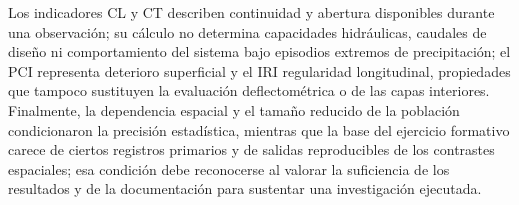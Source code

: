 Los indicadores CL y CT describen continuidad y abertura disponibles durante una observación; su cálculo no determina capacidades hidráulicas, caudales de diseño ni comportamiento del sistema bajo episodios extremos de precipitación; el PCI representa deterioro superficial y el IRI regularidad longitudinal, propiedades que tampoco sustituyen la evaluación deflectométrica o de las capas interiores. Finalmente, la dependencia espacial y el tamaño reducido de la población condicionaron la precisión estadística, mientras que la base del ejercicio formativo carece de ciertos registros primarios y de salidas reproducibles de los contrastes espaciales; esa condición debe reconocerse al valorar la suficiencia de los resultados y de la documentación para sustentar una investigación ejecutada.
\endgroup
